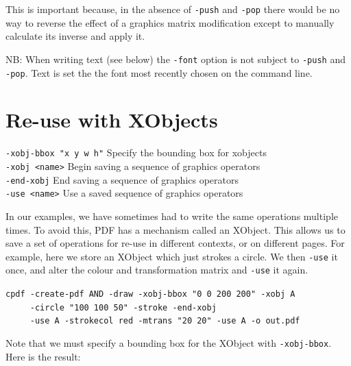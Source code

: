 \documentclass{book}
\begin{document}
\noindent This is important because, in the absence of \texttt{-push} and \texttt{-pop} there would be no way to reverse the effect of a graphics matrix modification except to manually calculate its inverse and apply it.

NB: When writing text (see below) the \texttt{-font} option is not subject to \texttt{-push} and \texttt{-pop}. Text is set the the font most recently chosen on the command line.

\section{Re-use with XObjects}
  {\small\begin{framed}
   \vspace{1.5mm}
   \noindent\verb!-xobj-bbox "x y w h"! Specify the bounding box for xobjects\\
   \noindent\verb!-xobj <name>! Begin saving a sequence of graphics operators\\
   \noindent\verb!-end-xobj! End saving a sequence of graphics operators\\
   \noindent\verb!-use <name>! Use a saved sequence of graphics operators
  \end{framed}}

In our examples, we have sometimes had to write the same operations multiple times. To avoid this, PDF has a mechanism called an XObject. This allows us to save a set of operations for re-use in different contexts, or on different pages. For example, here we store an XObject which just strokes a circle. We then \texttt{-use} it once, and alter the colour and transformation matrix and \texttt{-use} it again.

\begin{framed}
 \noindent\small\verb?cpdf -create-pdf AND -draw -xobj-bbox "0 0 200 200" -xobj A?\\
 \noindent\small\verb?     -circle "100 100 50" -stroke -end-xobj?\\
 \noindent\small\verb?     -use A -strokecol red -mtrans "20 20" -use A -o out.pdf?
\end{framed}

\noindent Note that we must specify a bounding box for the XObject with \texttt{-xobj-bbox}. Here is the result:

\bigskip
{}
\bigskip
\end{document}
